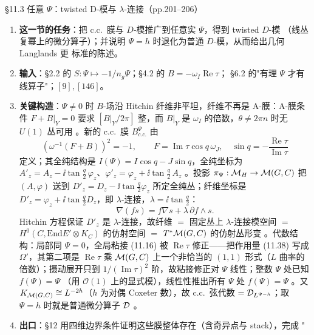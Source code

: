 \begin{kcard}{\S11.3 任意 $\Psi$：twisted D-模与 $\lambda$-连接（pp.201--206）}
\begin{enumerate}[label=\textbf{\arabic*}]
\item \textbf{这一节的任务}：把 c.c.\ 膜与 $D$-模推广到任意实 $\Psi$，得到 twisted $D$-模
  （线丛复幂上的微分算子）；并说明 $\Psi=h$ 时退化为普通 $D$-模，从而给出几何 Langlands 更
  标准的陈述。
\item \textbf{输入}：\S2.2 的 $S:\Psi\mapsto-1/n_g\Psi$；\S4.2 的 $B=-\omega_I\operatorname{Re}\tau$；
  \S6.2 的"有理 $\Psi$ 才有线算子"；$[9],[146]$。
\item \textbf{关键构造}：$\Psi\neq0$ 时 $B$-场沿 Hitchin 纤维非平坦，纤维不再是 A-膜：A-膜条件
  $F+B|_Y=0$ 要求 $[B|_Y/2\pi]$ 整，而 $B|_Y$ 是 $\omega_I$ 的倍数，$\theta\neq2\pi n$ 时无
  $U(1)$ 丛可用 \pA{}。新的 c.c.\ 膜 $B^\Psi_{c.c.}$ 由
\begin{equation}
(\omega^{-1}(F+B))^2=-1,\qquad
F=\operatorname{Im}\tau\cos q\,\omega_J,\quad
\sin q=-\frac{\operatorname{Re}\tau}{\operatorname{Im}\tau}
\label{eq:geom-cc-psi}
\end{equation}
  定义；其全纯结构是 $I(\Psi)=I\cos q-J\sin q$，全纯坐标为
  $A'_z=A_z-\ii\tan\frac q2\,\varphi_z$、$\varphi'_z=\varphi_z+\ii\tan\frac q2\,A_z$
  \pA{}。投影 $\pi_\Psi:\mathcal{M}_H\to\mathcal{M}(G,C)$ 把 $(A,\varphi)$ 送到 $D'_z=D_z-\ii\tan\frac
  q2\varphi_z$ 所定全纯丛；纤维坐标是
  $D'_z=\varphi_z+\ii\tan\frac q2D_z$，即 $\lambda$-连接，$\lambda=\ii\tan\frac q2$：
\begin{equation}
\nabla(fs)=f\nabla s+\lambda\,\partial f\wedge s .
\label{eq:geom-lambda-conn}
\end{equation}
  Hitchin 方程保证 $D'_z$ 是 $\lambda$-连接，故纤维 $=$ 固定丛上 $\lambda$-连接模空间 $=$
  $H^0(C,\mathrm{End}E'\otimes K_C)$ 的仿射空间 $=$ $T^*\mathcal{M}(G,C)$ 的仿射丛形变
  \pA{}。代数结构：局部同 $\Psi=0$，全局粘接 (11.16) 被
  $\operatorname{Re}\tau$ 修正——把作用量 (11.38) 写成 $\Omega'$，其第二项是
  $\operatorname{Re}\tau$ 乘 $\mathcal{M}(G,C)$ 上一个非恰当的 $(1,1)$ 形式（$L$ 曲率的倍数）；摄动展开只到
  $1/(\operatorname{Im}\tau)^2$ 阶，故粘接修正对 $\Psi$ 线性；整数 $\Psi$ 处已知 $f(\Psi)=\Psi$
  （用 $\mathcal O(1)$ 上的显式模），线性性推出所有 $\Psi$ 处 $f(\Psi)=\Psi$
  \pA{}。又 $K_{\mathcal{M}(G,C)}\cong L^{-2h}$（$h$ 为对偶 Coxeter 数），故 c.c.\ 弦代数
  $=\mathcal{D}_{L^{\Psi-h}}$；取 $\Psi=h$ 时就是普通微分算子 $\mathcal{D}$ \pA{}。
\item \textbf{出口}：\S12 用四维边界条件证明这些膜整体存在（含奇异点与 stack），完成 "

\end{enumerate}
\end{kcard}
